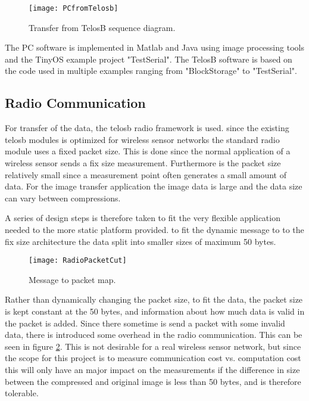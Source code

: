 \begin{figure}[H]
	\centering
	\texttt{[image: PCfromTelosb]}
	\caption{Transfer from TelosB sequence diagram.}
	\label{transferfromtelos}
\end{figure}
The PC software is implemented in Matlab and Java using image processing tools and the TinyOS example project "TestSerial". The TelosB software is based on the code used in multiple examples ranging from "BlockStorage" to "TestSerial". 

\subsection{Radio Communication}

For transfer of the data, the telosb radio framework is used. since the existing telosb modules is optimized for wireless sensor networks the standard radio module uses a fixed packet size. This is done since the normal application of a wireless sensor sends a fix size measurement. Furthermore is the packet size relatively small since a measurement point often generates a small amount of data. For the image transfer application the image data is large and the data size can vary between compressions.

A series of design steps is therefore taken to fit the very flexible application needed to the more static platform provided. to fit the dynamic message to to the fix size architecture the data split into smaller sizes of maximum 50 bytes. 

\begin{figure}[H]
	\centering
	\texttt{[image: RadioPacketCut]}
	\caption{Message to packet map.}
	\label{fig:RadioPacketCut}
\end{figure}

Rather than dynamically changing the packet size, to fit the data, the packet size is kept constant at the 50 bytes, and information about how much data is valid in the packet is added. Since there sometime is send a packet with some invalid data, there is introduced some overhead in the radio communication. This can be seen in figure \ref{fig:RadioPacketCut}. This is not desirable for a real wireless sensor network, but since the scope for this project is to measure communication cost vs. computation cost this will only have an major impact on the measurements if the difference in size between the compressed and original image is less than 50 bytes, and is therefore tolerable.

